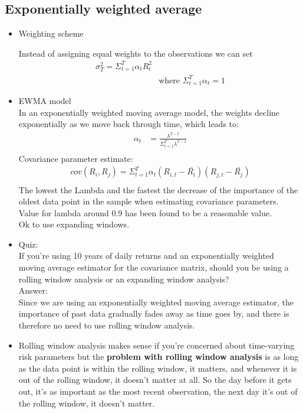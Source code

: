 \documentclass{maths}
\begin{document}
\subsection{Exponentially weighted average}
\begin{itemize}
\item Weighting scheme

Instead of assigning equal weights to the observations we can set\\
\begin{align*}
\sigma_T^2 =\Sigma_{t=1}^T\alpha_tR_t^2&\\ &\text{where }\Sigma_{t=1}^T\alpha_t = 1
\end{align*}

\item EWMA model\\

In an exponentially weighted moving average model, the weights decline exponentially as we move back through time, which leads to:\\
\begin{align*}
\alpha_t &= \frac{\lambda^{T-t}}{\Sigma_{t=1}^T\lambda^{T-t}}\\
\end{align*}
Covariance parameter estimate:\\
\begin{align*}
cov(R_i,R_j) = \Sigma_{t=1}^T\alpha_t\left(R_{i,t}-\bar{R_i}\right)\left(R_{j,t}-\bar{R_j}\right)\\
\end{align*}
The lowest the Lambda and the fastest the
decrease of the importance of the oldest data point in the sample when estimating covariance parameters. \\

Value for lambda
around 0.9 has been found to be a reasonable value.\\

Ok to use expanding windows.\\

\item Quiz:\\
If you’re using 10 years of daily returns and an exponentially weighted moving average estimator for the covariance matrix, should you be using a rolling window analysis or an expanding window analysis?\\
 
Answer:\\
Since we are using an exponentially weighted moving average estimator, the importance of past data gradually fades away as time goes by, and there is therefore no need to use rolling window analysis. 

\item Rolling window analysis makes sense if you're concerned about time-varying risk parameters but the \textbf{problem with rolling window analysis} is as long as the data point is within the rolling window, it matters, and whenever it is out of the rolling window, it doesn't matter at all. So the day before it gets out, it's as important as the most recent observation, the next day it's out of the rolling window, it doesn't matter. 


\end{itemize}
\end{document}

